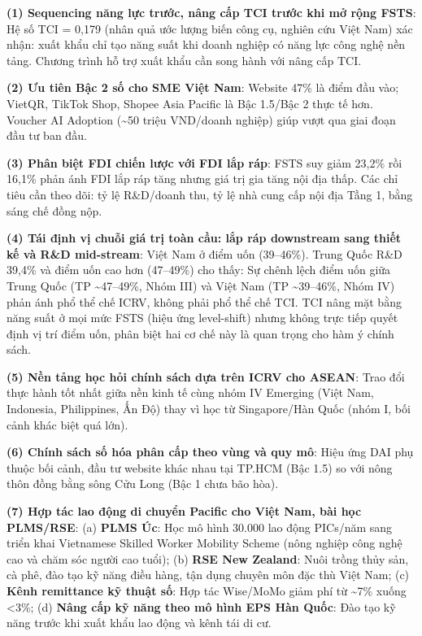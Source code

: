 \documentclass[
  a4paper,
  13pt]{extreport}
\begin{document}
\textbf{(1) Sequencing năng lực trước, nâng cấp TCI trước khi mở rộng
FSTS}: Hệ số TCI = 0,179 (nhân quả ước lượng biến công cụ, nghiên cứu
Việt Nam) xác nhận: xuất khẩu chỉ tạo năng suất khi doanh nghiệp có năng
lực công nghệ nền tảng. Chương trình hỗ trợ xuất khẩu cần song hành với
nâng cấp TCI.

\textbf{(2) Ưu tiên Bậc 2 số cho SME Việt Nam}: Website 47\% là điểm đầu
vào; VietQR, TikTok Shop, Shopee Asia Pacific là Bậc 1.5/Bậc 2 thực tế
hơn. Voucher AI Adoption (\textasciitilde50 triệu VND/doanh nghiệp) giúp
vượt qua giai đoạn đầu tư ban đầu.

\textbf{(3) Phân biệt FDI chiến lược với FDI lắp ráp}: FSTS suy giảm
23,2\% rồi 16,1\% phản ánh FDI lắp ráp tăng nhưng giá trị gia tăng nội
địa thấp. Các chỉ tiêu cần theo dõi: tỷ lệ R\&D/doanh thu, tỷ lệ nhà
cung cấp nội địa Tầng 1, bằng sáng chế đồng nộp.

\textbf{(4) Tái định vị chuỗi giá trị toàn cầu: lắp ráp downstream sang
thiết kế và R\&D mid-stream}: Việt Nam ở điểm uốn (39--46\%). Trung Quốc
R\&D 39,4\% và điểm uốn cao hơn (47--49\%) cho thấy: Sự chênh lệch điểm
uốn giữa Trung Quốc (TP \textasciitilde47--49\%, Nhóm III) và Việt Nam
(TP \textasciitilde39--46\%, Nhóm IV) phản ánh phổ thể chế ICRV, không
phải phổ thể chế TCI. TCI nâng mặt bằng năng suất ở mọi mức FSTS (hiệu
ứng level-shift) nhưng không trực tiếp quyết định vị trí điểm uốn, phân
biệt hai cơ chế này là quan trọng cho hàm ý chính sách.

\textbf{(5) Nền tảng học hỏi chính sách dựa trên ICRV cho ASEAN}: Trao
đổi thực hành tốt nhất giữa nền kinh tế cùng nhóm IV Emerging (Việt Nam,
Indonesia, Philippines, Ấn Độ) thay vì học từ Singapore/Hàn Quốc (nhóm
I, bối cảnh khác biệt quá lớn).

\textbf{(6) Chính sách số hóa phân cấp theo vùng và quy mô}: Hiệu ứng
DAI phụ thuộc bối cảnh, đầu tư website khác nhau tại TP.HCM (Bậc 1.5) so
với nông thôn đồng bằng sông Cửu Long (Bậc 1 chưa bão hòa).

\textbf{(7) Hợp tác lao động di chuyển Pacific cho Việt Nam, bài học
PLMS/RSE}: (a) \textbf{PLMS Úc}: Học mô hình 30.000 lao động PICs/năm
sang triển khai Vietnamese Skilled Worker Mobility Scheme (nông nghiệp
công nghệ cao và chăm sóc người cao tuổi); (b) \textbf{RSE New Zealand}:
Nuôi trồng thủy sản, cà phê, đào tạo kỹ năng điều hàng, tận dụng chuyên
môn đặc thù Việt Nam; (c) \textbf{Kênh remittance kỹ thuật số}: Hợp tác
Wise/MoMo giảm phí từ \textasciitilde7\% xuống \textless3\%; (d)
\textbf{Nâng cấp kỹ năng theo mô hình EPS Hàn Quốc}: Đào tạo kỹ năng
trước khi xuất khẩu lao động và kênh tái di cư.
\end{document}
